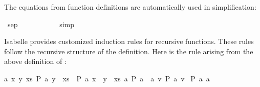 \begin{isabellebody}
\begin{isamarkuptext}
\begin{isabelle}
\end{isabelle}%
\end{isamarkuptext}%
\isamarkuptrue%
%
\begin{isamarkuptext}%
\noindent The equations from function definitions are automatically used in
  simplification:%
\end{isamarkuptext}%
\isamarkuptrue%
\isamarkupfalse%
\ {}sep\ {}\ {}{}{}\ {}{}\ {}{}\ {}\ {}{}{}\ {}{}\ {}{}\ {}{}\ {}{}{}\isanewline
%
\isadelimproof
%
\endisadelimproof
%
\isatagproof
{}\isamarkupfalse%
\ simp%
\endisatagproof
{\isafoldproof}%
%
\isadelimproof
%
\endisadelimproof
%
\isamarkuptrue%
%
\begin{isamarkuptext}%
Isabelle provides customized induction rules for recursive
  functions. These rules follow the recursive structure of the
  definition. Here is the rule  arising from the
  above definition of :

  \begin{isabelle}%
{}{}a\ x\ y\ xs{}\ {}P\ a\ {}y\ {}\ xs{}\ {}\ {}P\ a\ {}x\ {}\ y\ {}\ xs{}{}\ {}a{}\ {}P\ a\ {}{}{}\ {}a\ v{}\ {}P\ a\ {}v{}{}\isanewline
{}\ {}P\ {}a{}{}{}\ {}a{}{}{}%
\end{isabelle}
  

\end{isamarkuptext}
\end{isabellebody}
